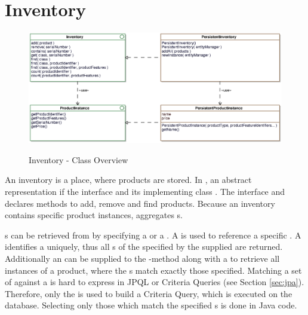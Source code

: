 \section{Inventory}
\label{sec:inventory}

\begin{figure}[ht]
	\centering
  \includegraphics[width=1.0\textwidth]{images/Inventory_Overview.eps}
	\label{inventory_overview}
	\caption{Inventory - Class Overview}
\end{figure}

An inventory is a place, where products are stored.
In \salespoint{}, an abstract representation if the  interface and its implementing class .
The interface and declares methods to add, remove and find products.
Because an inventory contains specific product instances,  aggregates s.

s can be retrieved from  by specifying a  or a .
A  is used to reference a specific .
A  identifies a  uniquely, thus all s of the  specified by the supplied  are returned.
Additionally an  can be supplied to the -method along with a  to retrieve all instances of a product, where the s match exactly those specified.
Matching a set of  against a  is hard to express in JPQL or Criteria Queries (see Section \ref{sec:jpa}).
Therefore, only the  is used to build a Criteria Query, which is executed on the database.
Selecting only those  which match the specified s is done in Java code.

